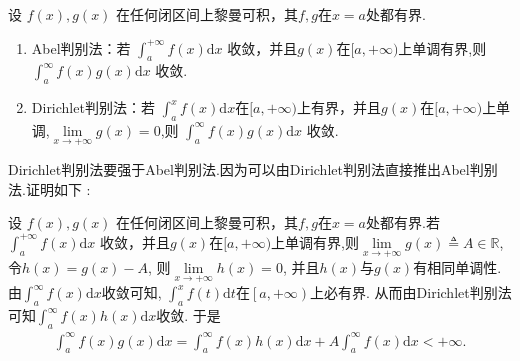 \documentclass[../../main.tex]{subfiles}
\begin{document}
\begin{theorem}[A-D判别法]\label{theorem:A-D判别法}
设 \(f(x),g(x)\) 在任何闭区间上黎曼可积，其$f,g$在$x=a$处都有界.
\begin{enumerate}
\item {\heiti Abel判别法}：若 \(\int_{a}^{+\infty} f(x) \mathrm{d}x\) 收敛，并且$g(x)$在$[a,+\infty)$上单调有界,则 \(\int_{a}^{\infty} f(x)g(x) \mathrm{d}x\) 收敛.

\item {\heiti Dirichlet判别法}：若 \(\int_{a}^{x} f(x) \mathrm{d}x\)在$[a,+\infty)$上有界，并且\(g(x)\)在\([a,+\infty)\)上单调,$\underset{x\rightarrow +\infty}{\lim}g\left( x \right) =0$,则 \(\int_{a}^{\infty} f(x)g(x) \mathrm{d}x\) 收敛.
\end{enumerate}
\end{theorem}
\begin{remark}
Dirichlet判别法要强于Abel判别法.因为可以由Dirichlet判别法直接推出Abel判别法.证明如下 :

设 \(f(x),g(x)\) 在任何闭区间上黎曼可积，其$f,g$在$x=a$处都有界.若 \(\int_{a}^{+\infty} f(x) \mathrm{d}x\) 收敛，并且$g(x)$在$[a,+\infty)$上单调有界,则$\lim\limits_{x\rightarrow +\infty}g\left( x \right) \triangleq A\in \mathbb{R} $, 令$h\left( x \right) =g\left( x \right) -A$, 则$\lim\limits_{x\rightarrow +\infty}h\left( x \right) =0$, 并且$h\left( x \right) $与$g\left( x \right) $有相同单调性. 由$\int_a^{\infty}{f\left( x \right)}\mathrm{d}x$收敛可知, $\int_a^x{f\left( t \right)}\mathrm{d}t$在$\left[ a,+\infty \right) $上必有界. 从而由Dirichlet判别法可知$\int_a^{\infty}{f\left( x \right) h\left( x \right)}\mathrm{d}x$收敛. 于是
\begin{align*}
\int_a^{\infty}{f\left( x \right) g\left( x \right)}\mathrm{d}x=\int_a^{\infty}{f\left( x \right) h\left( x \right)}\mathrm{d}x+A\int_a^{\infty}{f\left( x \right)}\mathrm{d}x<+\infty .
\end{align*}
\end{remark}
\end{document}
